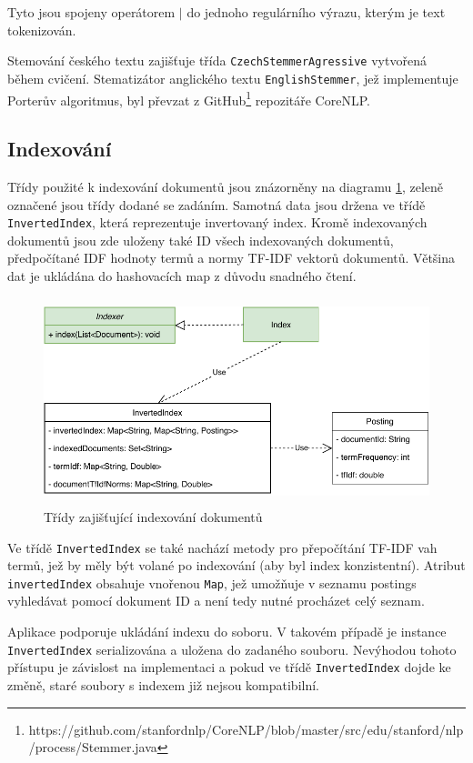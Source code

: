 \documentclass[11pt,a4paper]{scrartcl}
\begin{document}
	Tyto jsou spojeny operátorem $|$ do jednoho regulárního výrazu, kterým je text tokenizován.
	
	Stemování českého textu zajišťuje třída \verb|CzechStemmerAgressive| vytvořená během cvičení. Stematizátor anglického textu \verb|EnglishStemmer|, jež implementuje Porterův algoritmus, byl převzat z GitHub\footnote{https://github.com/stanfordnlp/CoreNLP/blob/master/src/edu/stanford/nlp/process/Stemmer.java} repozitáře CoreNLP.
	
	
	\subsection{Indexování}
	
	Třídy použité k indexování dokumentů jsou znázorněny na diagramu \ref{fig:index-uml}, zeleně označené jsou třídy dodané se zadáním. Samotná data jsou držena ve třídě \verb|InvertedIndex|, která reprezentuje invertovaný index. Kromě indexovaných dokumentů jsou zde uloženy také ID všech indexovaných dokumentů, předpočítané IDF hodnoty termů a normy TF-IDF vektorů dokumentů. 	Většina dat je ukládána do hashovacích map z důvodu snadného čtení.  
	
	\begin{figure}[!h]
		\centering
		\includegraphics[height=6cm]{index-uml}
		\caption{Třídy zajišťující indexování dokumentů}
		\label{fig:index-uml}
	\end{figure} 

	Ve třídě \verb|InvertedIndex| se také nachází metody pro přepočítání TF-IDF vah termů, jež by měly být volané po indexování (aby byl index konzistentní). Atribut \verb|invertedIndex| obsahuje vnořenou \verb|Map|, jež umožňuje v seznamu postings vyhledávat pomocí dokument ID a není tedy nutné procházet celý seznam. 
	
	Aplikace podporuje ukládání indexu do soboru. V takovém případě je instance \verb|InvertedIndex| serializována a uložena do zadaného souboru. Nevýhodou tohoto přístupu je závislost na implementaci a pokud ve třídě \verb|InvertedIndex|  dojde ke změně, staré soubory s indexem již nejsou kompatibilní.
	
\end{document}
